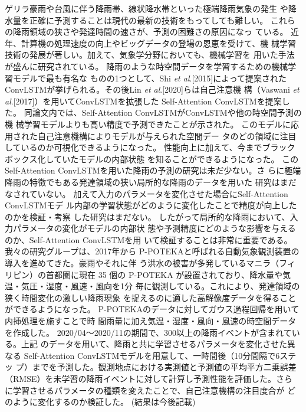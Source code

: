 ゲリラ豪雨や台風に伴う降雨帯、線状降水帯といった極端降雨気象の発生
や降水量を正確に予測することは現代の最新の技術をもってしても難しい。
これらの降雨領域の狭さや発達時間の速さが、予測の困難さの原因になっ
ている。
近年、計算機の処理速度の向上やビッグデータの登場の恩恵を受けて、機
械学習技術の発展が著しい。加えて、気象学分野においても、機械学習を
用いた手法が盛んに研究されている。
降雨のような時空間データを学習するための機械学習モデルで最も有名な
ものの1つとして、Shi \textit{et al}.[2015]によって提案された
ConvLSTMが挙げられる。その後Lin \textit{et al}.[2020]らは自己注意機
構（Vaswani \textit{et al}.[2017]）を用いてConvLSTMを拡張した
Self-Attention ConvLSTMを提案した。
同論文内では、Self-Attention ConvLSTMがConvLSTMや他の時空間予測の機
械学習モデルよりも高い精度で予測できたことが示された。
このモデルに応用された自己注意機構によりモデルが与えられた空間デー
タのどの領域に注目しているのか可視化できるようになった。
性能向上に加えて、今までブラックボックス化していたモデルの内部状態
を知ることができるようになった。
このSelf-Attention ConvLSTMを用いた降雨の予測の研究は未だ少ない。さ
らに極端降雨の特徴でもある発達領域の狭い局所的な降雨のデータを用いた
研究はまだなされていない。
加えて入力のパラメータを変化させた場合にSelf-Attention ConvLSTMモデ
ル内部の学習状態がどのように変化したことで精度が向上したのかを検証・考察
した研究はまだない。
したがって局所的な降雨において、入力パラメータの変化がモデルの内部状
態や予測精度にどのような影響を与えるのか、Self-Attention ConvLSTMを用
いて検証することは非常に重要である。我々の研究グループは、2017年から
P-POTEKAと呼ばれる自動気象観測装置の導入を進めてきた。豪雨やそれに伴
う洪水の被害が多発しているマニラ（フィリピン）の首都圏に現在 35 個の
P-POTEKA が設置されており、降水量や気温・気圧・湿度・風速・風向を1分
毎に観測している。これにより、発達領域の狭く時間変化の激しい降雨現象
を捉えるのに適した高解像度データを得ることができるようになった。
P-POTEKAのデータに対してガウス過程回帰を用いて内挿処理を施すことで時
間雨量に加え気温・湿度・風向・風速の時空間データを作成した。
2020/04～2020/11の期間で、300以上の降雨イベントが含まれている。上記
のデータを用いて、降雨と共に学習させるパラメータを変化させた異なる
Self-Attention ConvLSTMモデルを用意して、一時間後（10分間隔で6ステッ
プ）までを予測した。観測地点における実測値と予測値の平均平方二乗誤差
（RMSE）を未学習の降雨イベントに対して計算し予測性能を評価した。さら
に学習させるパラメータの種類を変えたことで、自己注意機構の注目度合が
どのように変化するのか検証した。
(結果は今後記載)